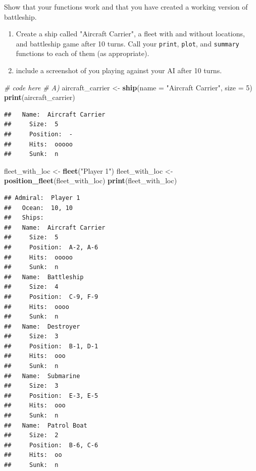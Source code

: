 \documentclass[
]{article}
\newenvironment{Shaded}{\begin{snugshade}}{\end{snugshade}}
\newcommand{\AttributeTok}[1]{\textcolor[rgb]{0.13,0.29,0.53}{#1}}
\newcommand{\CommentTok}[1]{\textcolor[rgb]{0.56,0.35,0.01}{\textit{#1}}}
\newcommand{\DecValTok}[1]{\textcolor[rgb]{0.00,0.00,0.81}{#1}}
\newcommand{\FunctionTok}[1]{\textcolor[rgb]{0.13,0.29,0.53}{\textbf{#1}}}
\newcommand{\NormalTok}[1]{#1}
\newcommand{\OtherTok}[1]{\textcolor[rgb]{0.56,0.35,0.01}{#1}}
\newcommand{\StringTok}[1]{\textcolor[rgb]{0.31,0.60,0.02}{#1}}
\begin{document}
Show that your functions work and that you have created a working
version of battleship.

\begin{enumerate}[label=\alph*)]
\item Create a ship called "Aircraft Carrier", a fleet with and without locations, and battleship game after 10 turns. Call your \texttt{print}, \texttt{plot}, and \texttt{summary} functions to each of them (as appropriate).
\item include a screenshot of you playing against your AI after 10 turns.
\end{enumerate}

\begin{Shaded}
\begin{Highlighting}[]
\CommentTok{\# code here}
\CommentTok{\# A)}
\NormalTok{aircraft\_carrier }\OtherTok{\textless{}{-}} \FunctionTok{ship}\NormalTok{(}\AttributeTok{name =} \StringTok{"Aircraft Carrier"}\NormalTok{, }\AttributeTok{size =} \DecValTok{5}\NormalTok{)}
\FunctionTok{print}\NormalTok{(aircraft\_carrier)}
\end{Highlighting}
\end{Shaded}

\begin{verbatim}
##   Name:  Aircraft Carrier 
##     Size:  5 
##     Position:  - 
##     Hits:  ooooo 
##     Sunk:  n
\end{verbatim}

\begin{Shaded}
\begin{Highlighting}[]
\NormalTok{fleet\_with\_loc }\OtherTok{\textless{}{-}} \FunctionTok{fleet}\NormalTok{(}\StringTok{"Player 1"}\NormalTok{)}
\NormalTok{fleet\_with\_loc }\OtherTok{\textless{}{-}} \FunctionTok{position\_fleet}\NormalTok{(fleet\_with\_loc)}
\FunctionTok{print}\NormalTok{(fleet\_with\_loc)}
\end{Highlighting}
\end{Shaded}

\begin{verbatim}
## Admiral:  Player 1 
##   Ocean:  10, 10 
##   Ships:
##   Name:  Aircraft Carrier 
##     Size:  5 
##     Position:  A-2, A-6 
##     Hits:  ooooo 
##     Sunk:  n 
##   Name:  Battleship 
##     Size:  4 
##     Position:  C-9, F-9 
##     Hits:  oooo 
##     Sunk:  n 
##   Name:  Destroyer 
##     Size:  3 
##     Position:  B-1, D-1 
##     Hits:  ooo 
##     Sunk:  n 
##   Name:  Submarine 
##     Size:  3 
##     Position:  E-3, E-5 
##     Hits:  ooo 
##     Sunk:  n 
##   Name:  Patrol Boat 
##     Size:  2 
##     Position:  B-6, C-6 
##     Hits:  oo 
##     Sunk:  n
\end{verbatim}
\end{document}
